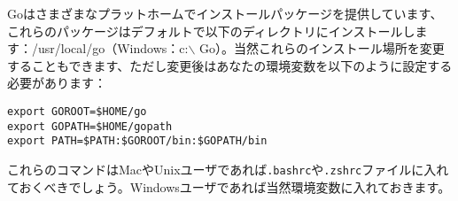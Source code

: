 Goはさまざまなプラットホームでインストールパッケージを提供しています、これらのパッケージはデフォルトで以下のディレクトリにインストールします：\//usr\//local\//go（Windows：c:$\backslash$ Go）。当然これらのインストール場所を変更することもできます、ただし変更後はあなたの環境変数を以下のように設定する必要があります：

\begin{lstlisting}[numbers=none]
export GOROOT=$HOME/go
export GOPATH=$HOME/gopath
export PATH=$PATH:$GOROOT/bin:$GOPATH/bin
\end{lstlisting}


これらのコマンドはMacやUnixユーザであれば\texttt{.bashrc}や\texttt{.zshrc}ファイルに入れておくべきでしょう。Windowsユーザであれば当然環境変数に入れておきます。

